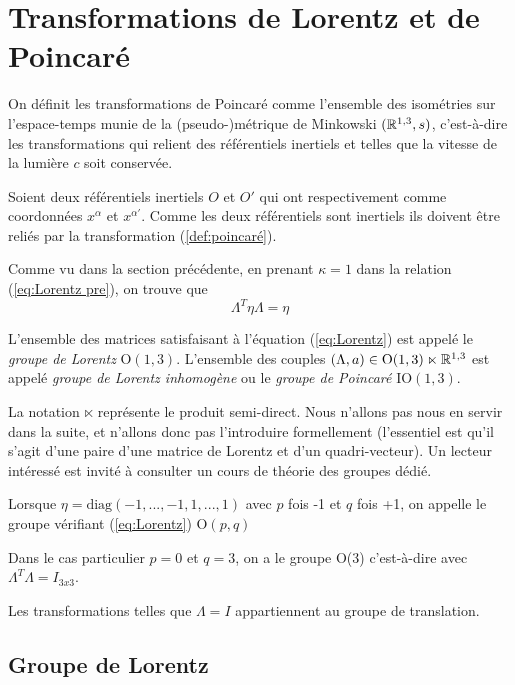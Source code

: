 {\section{Transformations de Lorentz et de Poincaré}

On définit les transformations de Poincaré comme l'ensemble des isométries sur l'espace-temps munie de la (pseudo-)métrique de Minkowski $(\mathbb{R}^{1,3},s)$, c'est-à-dire les transformations qui relient des référentiels inertiels et telles que la vitesse de la lumière $c$ soit conservée.

Soient deux référentiels inertiels $O$ et $O'$ qui ont respectivement comme coordonnées $x^{\alpha}$ et $x^{\alpha '}$. 
Comme les deux référentiels sont inertiels ils doivent être reliés par la transformation (\ref{def:poincaré}). 

Comme vu dans la section précédente, en prenant $\kappa = 1$ dans la relation (\ref{eq:Lorentz pre}), on trouve que
\begin{equation}
    \label{eq:Lorentz}
    \boxed{\Lambda ^{T} \eta \Lambda = \eta}
\end{equation}

L'ensemble des matrices satisfaisant à l'équation (\ref{eq:Lorentz}) est appelé le \textit{groupe de Lorentz} O$(1,3)$. L'ensemble des couples $(\Lambda,a) \in \mathrm{O}(1,3) \ltimes \mathbb{R}^{1,3}$ est appelé \textit{groupe de Lorentz inhomogène} ou le \textit{groupe de Poincaré} $\mathrm{IO}(1,3)$. 
\begin{rmk}
    La notation $\ltimes$ représente le produit semi-direct. Nous n'allons pas nous en servir dans la suite, et n'allons donc pas l'introduire formellement (l'essentiel est qu'il s'agit d'une paire d'une matrice de Lorentz et d'un quadri-vecteur). Un lecteur intéressé est invité à consulter un cours de théorie des groupes dédié.
\end{rmk}
\begin{rmk}
Lorsque $\eta = \text{diag}(-1,...,-1,1,...,1)$ avec $p$ fois -1 et $q$ fois +1, on appelle le groupe vérifiant (\ref{eq:Lorentz}) O$(p,q)$
    
\end{rmk}
\begin{rmk}
    Dans le cas particulier $p =0$ et $q=3$, on a le groupe O(3) c'est-à-dire avec $\Lambda ^{T} \Lambda = I_{3x3}$. 
\end{rmk}

Les transformations telles que $\Lambda =  I$ appartiennent au groupe de translation.

\subsection{Groupe de Lorentz}

}
